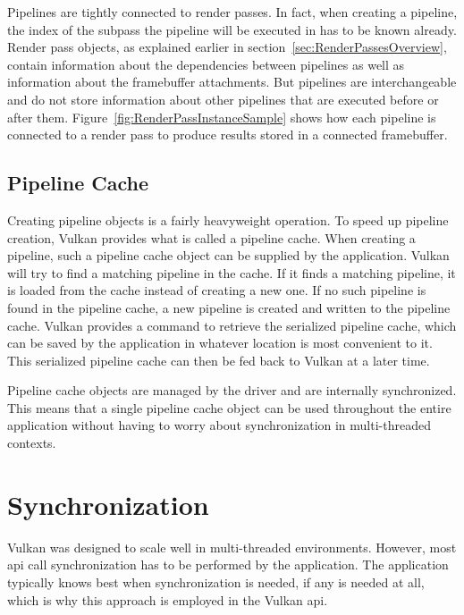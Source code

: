    Pipelines are tightly connected to render passes.
    In fact, when creating a pipeline, the index of the subpass the pipeline will be executed in has to be known already.
    Render pass objects, as explained earlier in section~\ref{sec:RenderPassesOverview}, contain information about the dependencies between pipelines as well as information about the framebuffer attachments.
    But pipelines are interchangeable and do not store information about other pipelines that are executed before or after them.
    Figure~\ref{fig:RenderPassInstanceSample} shows how each pipeline is connected to a render pass to produce results stored in a connected framebuffer.

    \subsection{Pipeline Cache}
    \label{subsec:PipelineCache}
      Creating pipeline objects is a fairly heavyweight operation.
      To speed up pipeline creation, Vulkan provides what is called a pipeline cache.
      When creating a pipeline, such a pipeline cache object can be supplied by the \gls{application}.
      Vulkan will try to find a matching pipeline in the cache.
      If it finds a matching pipeline, it is loaded from the cache instead of creating a new one.
      If no such pipeline is found in the pipeline cache, a new pipeline is created and written to the pipeline cache.
      Vulkan provides a command to retrieve the serialized pipeline cache, which can be saved by the \gls{application} in whatever location is most convenient to it.
      This serialized pipeline cache can then be fed back to Vulkan at a later time.

      Pipeline cache objects are managed by the \gls{driver} and are internally synchronized.
      This means that a single pipeline cache object can be used throughout the entire application without having to worry about synchronization in multi-threaded contexts.


  \section{Synchronization}
    Vulkan was designed to scale well in multi-threaded environments.
    However, most \gls{api} call synchronization has to be performed by the application.
    The application typically knows best when synchronization is needed, if any is needed at all, which is why this approach is employed in the Vulkan \gls{api}.

